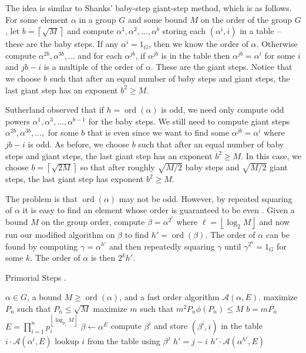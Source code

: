 \documentclass{ucalgthes1}
\theoremstyle{definition}
\DeclareMathOperator{\ord}{ord}
\newcommand{\floor}[1]{\left\lfloor #1 \right\rfloor}
\newcommand{\ceil}[1]{\left\lceil #1 \right\rceil}
\begin{document}
The idea is similar to Shanks' baby-step giant-step method, which is as follows.  For some element $\alpha$ in a group $G$ and some bound $M$ on the order of the group $G$, let $b = \ceil{\sqrt{M}}$ and compute $\alpha^1, \alpha^2, ..., \alpha^b$ storing each $(\alpha^i, i)$ in a table -- these are the baby steps.  If any $\alpha^i = 1_G$, then we know the order of $\alpha$.  Otherwise compute $\alpha^{2b}, \alpha^{3b}, ...$ and for each $\alpha^{jb}$, if $\alpha^{jb}$ is in the table then $\alpha^{jb} = \alpha^i$ for some $i$ and $jb - i$ is a multiple of the order of $\alpha$.  These are the giant steps.  Notice that we choose $b$ such that after an equal number of baby steps and giant steps, the last giant step has an exponent $b^2 \ge M$.

Sutherland observed \cite[p.56]{Sutherland2007} that if $h = \ord(\alpha)$ is odd, we need only compute odd powers $\alpha^1, \alpha^3, ..., \alpha^{b-1}$ for the baby steps.  We still need to compute giant steps $\alpha^{2b}, \alpha^{3b}, ...,$ for some $b$ that is even since we want to find some $\alpha^{jb} = \alpha^i$ where $jb - i$ is odd.  As before, we choose $b$ such that after an equal number of baby steps and giant steps, the last giant step has an exponent $b^2 \ge M$.  In this case, we choose $b = \ceil{\sqrt{2M}}$ so that after roughly $\sqrt{M/2}$ baby steps and $\sqrt{M/2}$ giant steps, the last giant step has exponent $b^2 \ge M$.

The problem is that $\ord(\alpha)$ may not be odd.  However, by repeated squaring of $\alpha$ it is easy to find an element whose order is guaranteed to be even \cite[p.56]{Sutherland2007}.  Given a bound $M$ on the group order, compute $\beta = \alpha^{2^\ell}$ where $\ell = \floor{\log_2 M}$ and now run our modified algorithm on $\beta$ to find $h' = \ord(\beta)$.  The order of $\alpha$ can be found by computing $\gamma = \alpha^{h'}$ and then repeatedly squaring $\gamma$ until $\gamma^{2^k} = 1_G$ for some $k$.  The order of $\alpha$ is then $2^k h'$.

\begin{algorithm}[h]
\caption{Primorial Steps \cite[p.57]{Sutherland2007}.}
\label{alg:primorial}
\begin{algorithmic}[1]
\REQUIRE $\alpha \in G$, a bound $M \ge \ord(\alpha)$, and a fast order algorithm $\mathcal A(\alpha, E)$.
\STATE maximize $P_n$ such that $P_n \le \sqrt{M}$
\STATE maximize $m$ such that $m^2P_n\phi(P_n) \le M$
\STATE $b = mP_n$
\STATE $E = \prod_{i=1}^n p_i^{\floor{\log_{p_i} M}}$
\STATE $\beta \gets \alpha^E$
	\STATE compute $\beta^i$ and store $(\beta^i, i)$ in the table 
		\RETURN $i \cdot \mathcal A(\alpha^i, E)$
	\ENDIF
\ENDFOR
{}
		\STATE lookup $i$ from the table using $\beta^j$ 
		\STATE $h' = j - i$
		\RETURN $h' \cdot \mathcal A(\alpha^{h'}, E)$
	\ENDIF
\ENDFOR
\end{algorithmic}
\end{algorithm}
\end{document}
